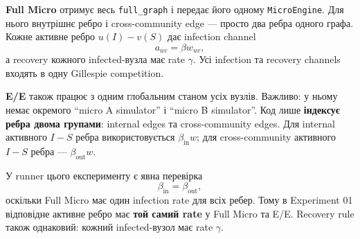 \documentclass[11pt,a4paper]{article}
\begin{document}
\textbf{Full Micro} отримує весь \texttt{full\_graph} і передає його одному \texttt{MicroEngine}. Для нього внутрішнє ребро і cross-community edge --- просто два ребра одного графа. Кожне активне ребро $u(I)-v(S)$ дає infection channel
\[
 a_{uv}=\beta w_{uv},
\]
а recovery кожного infected-вузла має rate $\gamma$. Усі infection та recovery channels входять в одну Gillespie competition.

\textbf{E/E} також працює з одним глобальним станом усіх вузлів. Важливо: у ньому немає окремого ``micro A simulator'' і ``micro B simulator''. Код лише \textbf{індексує ребра двома групами}: internal edges та cross-community edges. Для internal активного $I-S$ ребра використовується $\beta_{\mathrm{in}}w$; для cross-community активного $I-S$ ребра --- $\beta_{\mathrm{out}}w$.

У runner цього експерименту є явна перевірка
\[
\beta_{\mathrm{in}}=\beta_{\mathrm{out}},
\]
оскільки Full Micro має один infection rate для всіх ребер. Тому в Experiment 01 відповідне активне ребро має \textbf{той самий rate} у Full Micro та E/E. Recovery rule також однаковий: кожний infected-вузол має rate $\gamma$.
\end{document}
